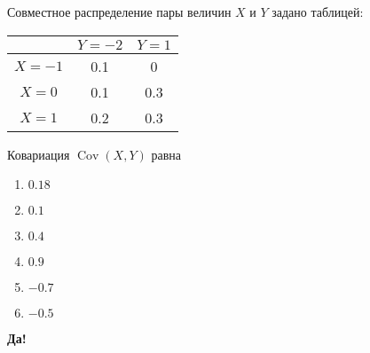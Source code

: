 \documentclass[t]{beamer}
\DeclareMathOperator{\Cov}{Cov}
\begin{document}
 \begin{frame} \label{16-Yes} 
\begin{block}{16} 

Совместное распределение пары величин $X$ и $Y$ задано таблицей:

\begin{center}
\begin{tabular}{c|cc}
 & $Y=-2$ & $Y=1$ \\
\hline
$X=-1$ & 0.1 & 0 \\
$X=0$ & 0.1 & 0.3 \\
$X=1$ & 0.2 & 0.3 \\
\end{tabular}
\end{center}
\vspace{0.2cm} 
 
 
Ковариация $\Cov(X, Y)$ равна
 


 \end{block} 
\begin{enumerate} 
\item[] \hyperlink{16-Yes}{\beamergotobutton{} $0.18$}
\item[] \hyperlink{16-No}{\beamergotobutton{} $0.1$}
\item[] \hyperlink{16-No}{\beamergotobutton{} $0.4$}
\item[] \hyperlink{16-No}{\beamergotobutton{} $0.9$}
\item[] \hyperlink{16-No}{\beamergotobutton{} $-0.7$}
\item[] \hyperlink{16-No}{\beamergotobutton{} $-0.5$}
\end{enumerate} 

 \textbf{Да!} 
 \hyperlink{17}{}\end{frame} 
\end{document}
